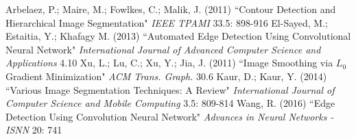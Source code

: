 \documentclass[11pt, twoside]{article}
\begin{document}
\newpage
\begin{thebibliography}{9}
Arbelaez, P.; Maire, M.; Fowlkes, C.; Malik, J. (2011)
``Contour Detection and Hierarchical Image Segmentation"
\textit{IEEE TPAMI} 33.5: 898-916
El-Sayed, M.; Estaitia, Y.; Khafagy M. (2013)
``Automated Edge Detection Using Convolutional
Neural Network"
\textit{International Journal of Advanced Computer Science and Applications} 4.10
Xu, L.; Lu, C.; Xu, Y.; Jia, J. (2011)
``Image Smoothing via $L_0$
 Gradient Minimization"
\textit{ACM Trans. Graph.} 30.6
Kaur, D.; Kaur, Y. (2014)
``Various Image Segmentation
Techniques: A Review"
\textit{International Journal of Computer Science and Mobile Computing} 3.5: 809-814
Wang, R. (2016)
``Edge Detection Using Convolution Neural Network"
\textit{Advances in Neural Networks - ISNN} 20: 741
\end{thebibliography}
\end{document}

